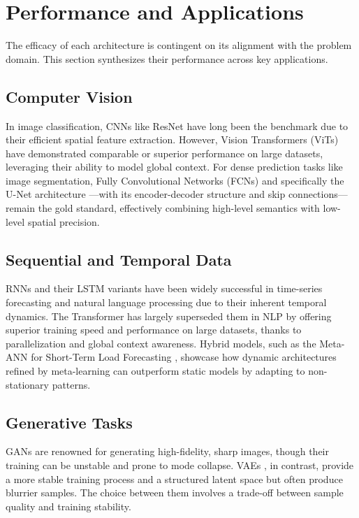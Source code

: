 \documentclass[10pt, conference]{IEEEtran}
\begin{document}
\section{Performance and Applications}
\label{sec:results}

 The efficacy of each architecture is contingent on its alignment with the
 problem domain. This section synthesizes their performance across key
 applications.

\subsection{Computer Vision}

 In image classification, CNNs like ResNet \cite{he2016deep} have long
 been the benchmark due to their efficient spatial feature extraction.
 However, Vision Transformers (ViTs) \cite{dosovitskiy2020image} have
 demonstrated comparable or superior performance on large datasets,
 leveraging their ability to model global context. For dense prediction
 tasks like image segmentation, Fully Convolutional Networks (FCNs) and
 specifically the U-Net architecture \cite{ronneberger2015u}—with its
 encoder-decoder structure and skip connections—remain the gold standard,
 effectively combining high-level semantics with low-level spatial
 precision.

\subsection{Sequential and Temporal Data}

 RNNs and their LSTM variants \cite{hochreiter1997long} have been widely
 successful in time-series forecasting and natural language processing due
 to their inherent temporal dynamics. The Transformer
 \cite{vaswani2017attention} has largely superseded them in NLP by
 offering superior training speed and performance on large datasets,
 thanks to parallelization and global context awareness. Hybrid models,
 such as the Meta-ANN for Short-Term Load Forecasting \cite{Xiao2022},
 showcase how dynamic architectures refined by meta-learning can
 outperform static models by adapting to non-stationary patterns.

\subsection{Generative Tasks}

 GANs \cite{goodfellow2014generative} are renowned for generating
 high-fidelity, sharp images, though their training can be unstable and
 prone to mode collapse. VAEs \cite{kingma2013auto}, in contrast, provide
 a more stable training process and a structured latent space but often
 produce blurrier samples. The choice between them involves a trade-off
 between sample quality and training stability.
\end{document}

